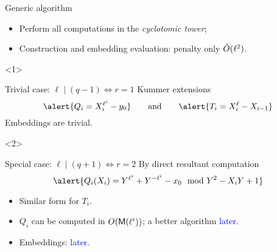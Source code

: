 \documentclass[12pt]{beamer}
\begin{document}

\begin{frame}
  \frametitle{\insertsection }

  \begin{exampleblock}{Generic algorithm}
    \begin{itemize}
    \item Perform all computations in the \emph{cyclotomic tower};
    \item Construction and embedding evaluation: penalty only \alert{$\tilde{O}(\ell^2)$}.
    \end{itemize}
  \end{exampleblock}

  \begin{overlayarea}{\textwidth}{5cm}
    \begin{onlyenv}<1>
      \begin{exampleblock}{Trivial case: $\ell \mid (q-1) \Leftrightarrow r=1$}
        Kummer extensions
        \[\alert{Q_i=X_i^{\ell^i}-y_0} \qquad\text{and}\qquad \alert{T_i=X_{i}^\ell-X_{i-1}}\]
        Embeddings are trivial.
      \end{exampleblock}
    \end{onlyenv}	

    \begin{onlyenv}<2>
      \begin{exampleblock}{Special case: $\ell \mid (q + 1) \Leftrightarrow r = 2$}
        By direct resultant computation
        \[\alert{Q_i(X_i) = Y^{\ell^i} + Y^{-\ell^i} - x_0 \mod Y^2-X_iY+1}\]

        \vspace*{-3mm}
        \begin{itemize}
        \item Similar form for $T_i$.
        \item $Q_i$ can be computed in $O(\mathsf{M}(\ell^i))$; a better algorithm \textcolor{blue}{later}.
        \item Embeddings: \textcolor{blue}{later}.
        \end{itemize}
      \end{exampleblock}
    \end{onlyenv}	
  \end{overlayarea}
\end{frame}


\end{document}
